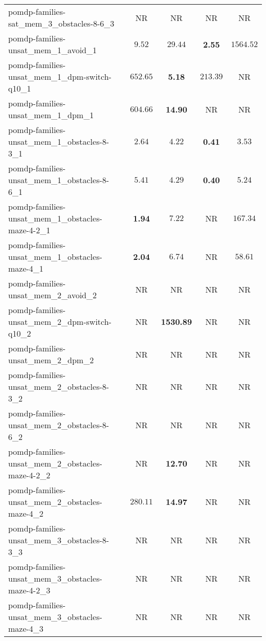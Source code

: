 \begin{tabular}{lcccc}
pomdp-families-sat\_mem\_3\_obstacles-8-6\_3 & NR & NR & NR & NR \\
pomdp-families-unsat\_mem\_1\_avoid\_1 & $9.52$ & $29.44$ & \textbf{2.55} & $1564.52$ \\
pomdp-families-unsat\_mem\_1\_dpm-switch-q10\_1 & $652.65$ & \textbf{5.18} & $213.39$ & NR \\
pomdp-families-unsat\_mem\_1\_dpm\_1 & $604.66$ & \textbf{14.90} & NR & NR \\
pomdp-families-unsat\_mem\_1\_obstacles-8-3\_1 & $2.64$ & $4.22$ & \textbf{0.41} & $3.53$ \\
pomdp-families-unsat\_mem\_1\_obstacles-8-6\_1 & $5.41$ & $4.29$ & \textbf{0.40} & $5.24$ \\
pomdp-families-unsat\_mem\_1\_obstacles-maze-4-2\_1 & \textbf{1.94} & $7.22$ & NR & $167.34$ \\
pomdp-families-unsat\_mem\_1\_obstacles-maze-4\_1 & \textbf{2.04} & $6.74$ & NR & $58.61$ \\
pomdp-families-unsat\_mem\_2\_avoid\_2 & NR & NR & NR & NR \\
pomdp-families-unsat\_mem\_2\_dpm-switch-q10\_2 & NR & \textbf{1530.89} & NR & NR \\
pomdp-families-unsat\_mem\_2\_dpm\_2 & NR & NR & NR & NR \\
pomdp-families-unsat\_mem\_2\_obstacles-8-3\_2 & NR & NR & NR & NR \\
pomdp-families-unsat\_mem\_2\_obstacles-8-6\_2 & NR & NR & NR & NR \\
pomdp-families-unsat\_mem\_2\_obstacles-maze-4-2\_2 & NR & \textbf{12.70} & NR & NR \\
pomdp-families-unsat\_mem\_2\_obstacles-maze-4\_2 & $280.11$ & \textbf{14.97} & NR & NR \\
pomdp-families-unsat\_mem\_3\_obstacles-8-3\_3 & NR & NR & NR & NR \\
pomdp-families-unsat\_mem\_3\_obstacles-maze-4-2\_3 & NR & NR & NR & NR \\
pomdp-families-unsat\_mem\_3\_obstacles-maze-4\_3 & NR & NR & NR & NR \\
\bottomrule
\end{tabular}
